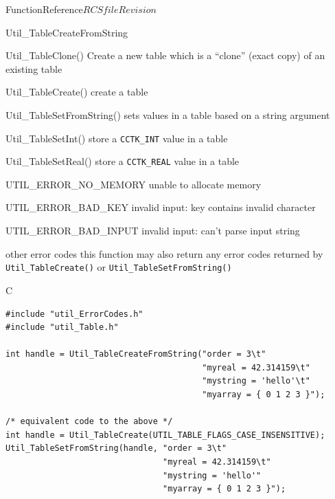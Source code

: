 \begin{cactuspart}{FunctionReference}{$RCSfile$}{$Revision$}
\begin{FunctionDescription}{Util\_TableCreateFromString}
\begin{SeeAlsoSection}
\begin{SeeAlso}{Util\_TableClone()}
Create a new table which is a ``clone'' (exact copy) of an existing
table
\end{SeeAlso}
\begin{SeeAlso}{Util\_TableCreate()}
create a table
\end{SeeAlso}
\begin{SeeAlso}{Util\_TableSetFromString()}
sets values in a table based on a string argument
\end{SeeAlso}
\begin{SeeAlso}{Util\_TableSetInt()}
store a \verb|CCTK_INT| value in a table
\end{SeeAlso}
\begin{SeeAlso}{Util\_TableSetReal()}
store a \verb|CCTK_REAL| value in a table
\end{SeeAlso}
\end{SeeAlsoSection}

\begin{ErrorSection}
\begin{Error}{UTIL\_ERROR\_NO\_MEMORY}
unable to allocate memory
\end{Error}
\begin{Error}{UTIL\_ERROR\_BAD\_KEY}
invalid input: key contains invalid character
\end{Error}
\begin{Error}{UTIL\_ERROR\_BAD\_INPUT}
invalid input: can't parse input string
\end{Error}
\begin{Error}{\rm other error codes}
this function may also return any error codes returned by
\verb|Util_TableCreate()| or \verb|Util_TableSetFromString()|
\end{Error}
\end{ErrorSection}

\begin{ExampleSection}
\begin{Example}{C}
\begin{verbatim}
#include "util_ErrorCodes.h"
#include "util_Table.h"

int handle = Util_TableCreateFromString("order = 3\t"
                                        "myreal = 42.314159\t"
                                        "mystring = 'hello'\t"
                                        "myarray = { 0 1 2 3 }");

/* equivalent code to the above */
int handle = Util_TableCreate(UTIL_TABLE_FLAGS_CASE_INSENSITIVE);
Util_TableSetFromString(handle, "order = 3\t"
                                "myreal = 42.314159\t"
                                "mystring = 'hello'"
                                "myarray = { 0 1 2 3 }");


\end{verbatim}
\end{Example}
\end{ExampleSection}
\end{FunctionDescription}
\end{cactuspart}
